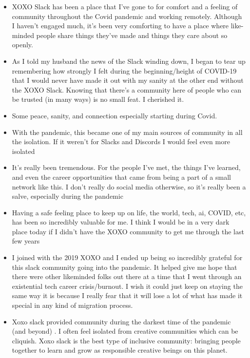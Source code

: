 \documentclass[
]{book}
\providecommand{\tightlist}{%
  \setlength{\itemsep}{0pt}\setlength{\parskip}{0pt}}
\begin{document}
\begin{itemize}
\tightlist
\item
  XOXO Slack has been a place that I've gone to for comfort and a feeling of community throughout the Covid pandemic and working remotely. Although I haven't engaged much, it's been very comforting to have a place where like-minded people share things they've made and things they care about so openly.
\item
  As I told my husband the news of the Slack winding down, I began to tear up remembering how strongly I felt during the beginning/height of COVID-19 that I would never have made it out with my sanity at the other end without the XOXO Slack. Knowing that there's a community here of people who can be trusted (in many ways) is no small feat. I cherished it.
\item
  Some peace, sanity, and connection especially starting during Covid.
\item
  With the pandemic, this became one of my main sources of community in all the isolation. If it weren't for Slacks and Discords I would feel even more isolated
\item
  It's really been tremendous. For the people I've met, the things I've learned, and even the career opportunities that came from being a part of a small network like this. I don't really do social media otherwise, so it's really been a salve, especially during the pandemic
\item
  Having a safe feeling place to keep up on life, the world, tech, ai, COVID, etc, has been so incredibly valuable for me. I think I would be in a very dark place today if I didn't have the XOXO community to get me through the last few years
\item
  I joined with the 2019 XOXO and I ended up being so incredibly grateful for this slack community going into the pandemic. It helped give me hope that there were other likeminded folks out there at a time that I went through an existential tech career crisis/burnout. I wish it could just keep on staying the same way it is because I really fear that it will lose a lot of what has made it special in any kind of migration process.
\item
  Xoxo slack provided community during the darkest time of the pandemic (and beyond) . I often feel isolated from creative communities which can be cliquish. Xoxo slack is the best type of inclusive community: bringing people together to learn and grow as responsible creative beings on this planet.
\end{itemize}
\end{document}
